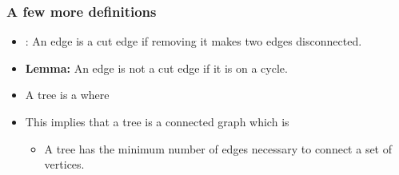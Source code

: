 \documentclass{beamer}
\begin{document}
\begin{frame}
  \frametitle{A few more definitions}

  {\larger
    \begin{itemize}
    \item {}: An edge is a cut edge if
      removing it makes two edges disconnected.

      \bigskip
      
    \item {\bf Lemma:} An edge is not a cut edge if it is on a
      cycle.

      \bigskip
      
    \item A tree is a  where

      \bigskip
      
    \item This implies that a tree is a connected graph which
      is {\bf{}}
      \begin{itemize}
      \item A tree has the minimum number of edges necessary to
        connect a set of vertices.
      \end{itemize}
    \end{itemize}
  }
\end{frame}
\end{document}
